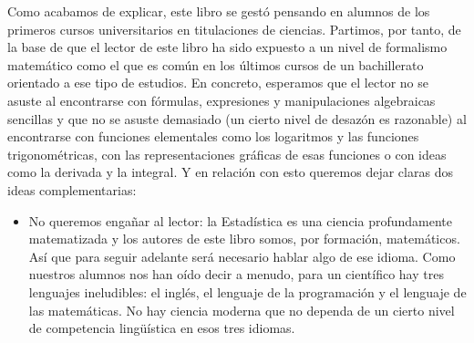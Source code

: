 Como acabamos de explicar, este libro se gestó pensando en alumnos de los primeros cursos universitarios en titulaciones de ciencias. Partimos, por tanto, de la base de que el lector de este libro ha sido expuesto a un nivel de formalismo matemático como el que es común en los últimos cursos de un bachillerato orientado a ese tipo de estudios. En concreto, esperamos que el lector no se asuste al encontrarse con fórmulas, expresiones y manipulaciones algebraicas sencillas y que no se asuste demasiado (un cierto nivel de desazón es razonable) al encontrarse con funciones elementales como los logaritmos y las funciones trigonométricas, con las representaciones gráficas de esas funciones o con ideas como la derivada y la integral. Y en relación con esto queremos dejar claras dos ideas complementarias:
\begin{itemize}
  \item No queremos engañar al lector: la Estadística es una ciencia profundamente matematizada y los autores de este libro somos, por formación, matemáticos. Así que para seguir adelante será necesario hablar algo de ese idioma. Como nuestros alumnos nos han oído decir a menudo, para un científico hay tres lenguajes ineludibles: el inglés, el lenguaje de la programación y el lenguaje de las matemáticas. No hay ciencia moderna que no dependa de un cierto nivel de competencia lingüística en esos tres idiomas. %

\end{itemize}
